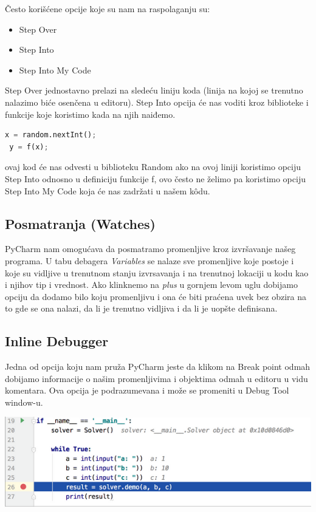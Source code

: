 \documentclass[a4paper]{article}
\begin{document}
Često korišćene opcije koje su nam na raspolaganju su:
\begin{itemize}
\item  Step Over
\item  Step Into
\item Step Into My Code
\end{itemize}
Step Over jednostavno prelazi na sledeću liniju koda (linija na kojoj se trenutno nalazimo biće osenčena u editoru). Step Into opcija će nas voditi kroz biblioteke i funkcije koje koristimo kada na njih naiđemo.
\begin{lstlisting}[language = Python, caption={Primer neki}]
 x = random.nextInt();
 y = f(x);
\end{lstlisting} 
 ovaj kod će nas odvesti u biblioteku Random ako na ovoj liniji koristimo opciju Step Into odnosno u definiciju funkcije f, ovo često ne želimo pa koristimo opciju Step Into My Code koja će nas zadržati u našem k\^{o}du. 
\subsection{Posmatranja (Watches)}
PyCharm nam omogućava da posmatramo promenljive kroz izvršavanje našeg programa. U tabu debagera \emph{Variables} se nalaze sve promenljive koje postoje i koje su vidljive u trenutnom stanju izvrsavanja i na trenutnoj lokaciji u kodu kao i njihov tip i vrednost. Ako klinknemo na \emph {plus} u gornjem levom uglu dobijamo opciju da dodamo bilo koju promenljivu i ona će biti praćena uvek bez obzira na to gde se ona nalazi, da li je trenutno vidljiva i da li je uopšte definisana.
\subsection{Inline Debugger}
Jedna od opcija koju nam pruža PyCharm jeste da klikom na Break point odmah dobijamo informacije o našim promenljivima i objektima odmah u editoru u vidu komentara. Ova opcija je podrazumevana i može se promeniti u Debug Tool window-u.


\includegraphics[scale = 0.4]{3}
\end{document}
